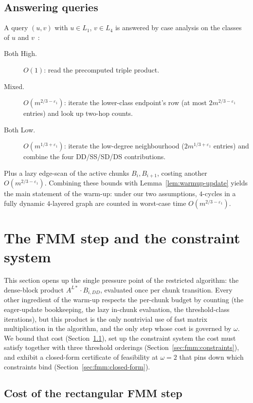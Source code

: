 \documentclass[sigconf,nonacm]{acmart}
\theoremstyle{plain}
\theoremstyle{definition}
\begin{document}
\subsection{Answering queries}
\label{sec:warmup:queries}
A query $(u, v)$ with $u \in L_1$, $v \in L_4$ is answered by case
analysis on the classes of $u$ and
$v$~\cite[Lemma~3.8]{AssadiShah25}:
\begin{description}
  \item[Both High.] $O(1)$: read the precomputed triple product.
  \item[Mixed.] $O(m^{2/3-\varepsilon_1})$: iterate the lower-class
    endpoint's row (at most $2m^{2/3-\varepsilon_1}$ entries) and
    look up two-hop counts.
  \item[Both Low.] $O(m^{1/3+\varepsilon_1})$: iterate the
    low-degree neighbourhood ($2m^{1/3+\varepsilon_1}$ entries) and
    combine the four DD/SS/SD/DS contributions.
\end{description}
Plus a lazy edge-scan of the active chunks $B_i, B_{i+1}$, costing
another $O(m^{2/3-\varepsilon_1})$. Combining these bounds with
Lemma~\ref{lem:warmup-update} yields the main statement of the
warm-up: under our two assumptions, $4$-cycles in a fully dynamic
$4$-layered graph are counted in worst-case time
$O(m^{2/3-\varepsilon_1})$.

\section{The FMM step and the constraint system}
\label{sec:fmm}

This section opens up the single pressure point of the restricted
algorithm: the dense-block product $A^{L*}\!\cdot\!B_{i,DD}$,
evaluated once per chunk transition. Every other ingredient of the
warm-up respects the per-chunk budget by counting (the eager-update
bookkeeping, the lazy in-chunk evaluation, the threshold-class
iterations), but this product is the only nontrivial use of fast
matrix multiplication in the algorithm, and the only step whose cost
is governed by $\omega$. We bound that cost
(Section~\ref{sec:fmm:step}), set up the constraint system the cost
must satisfy together with three threshold orderings
(Section~\ref{sec:fmm:constraints}), and exhibit a closed-form
certificate of feasibility at $\omega = 2$ that pins down which
constraints bind (Section~\ref{sec:fmm:closed-form}).

\subsection{Cost of the rectangular FMM step}
\label{sec:fmm:step}
\end{document}
